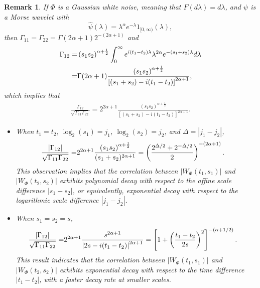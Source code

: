 \documentclass{amsart}
\newtheorem{Remark}{Remark}
\begin{document}
\begin{Remark}
If $\Phi$ is a Gaussian white noise, meaning that $F(d\lambda)=d\lambda$, and
$\psi$ is a Morse wavelet with
$$
\widehat{\psi}(\lambda) = \lambda^{\alpha}e^{-\lambda}1_{[0,\infty)}(\lambda),
$$
then
$ \Gamma_{11}=\Gamma_{22}= \Gamma(2\alpha+1)2^{-(2\alpha+1)}$ and
\begin{align}\notag
\Gamma_{12} =& \left(s_{1}s_{2}\right)^{\alpha+\frac{1}{2}}\int_{0}^{\infty}e^{i(t_{1}-t_{2})\lambda}\lambda^{2\alpha}e^{-(s_{1}+s_{2})\lambda}
d\lambda
\\\notag=&\Gamma(2\alpha+1)
\frac{\left(s_{1}s_{2}\right)^{\alpha+\frac{1}{2}}}{\left[(s_{1}+s_{2})-i(t_{1}-t_{2})\right]^{2\alpha+1}},
\end{align}
which implies that
\begin{align*}
\frac{\Gamma_{12}}{\sqrt{\Gamma_{11}\Gamma_{22}}} = 2^{2\alpha+1}
\frac{\left(s_{1}s_{2}\right)^{\alpha+\frac{1}{2}}}{\left[(s_{1}+s_{2})-i(t_{1}-t_{2})\right]^{2\alpha+1}}.
\end{align*}
\begin{itemize}
\item When $t_{1}=t_{2}$, $\log_{2}(s_{1})=j_{1}$,  $\log_{2}(s_{2})=j_{2}$, and $\Delta = |j_{1}-j_{2}|$,
\begin{align}\notag
\frac{|\Gamma_{12}|}{\sqrt{\Gamma_{11}\Gamma_{22}}}=&2^{2\alpha+1}
\frac{\left(s_{1}s_{2}\right)^{\alpha+\frac{1}{2}}}{(s_{1}+s_{2})^{2\alpha+1}}
=\left(\frac{2^{\Delta/2}+2^{-\Delta/2}}{2}\right)^{-(2\alpha+1)}.
\end{align}
This observation implies that the correlation between $\left|W_{\Phi}(t_{1},s_{1})\right|$ and $\left|W_{\Phi}(t_{2},s_{2})\right|$ exhibits polynomial decay with respect to the affine scale difference $|s_{1}-s_{2}|$,
or equivalently, exponential decay with respect to the logarithmic scale difference $|j_{1}-j_{2}|$.


\item When $s_{1}=s_{2}=s$,
\begin{align}\notag
\frac{|\Gamma_{12}|}{\sqrt{\Gamma_{11}\Gamma_{22}}}=&2^{2\alpha+1}
\frac{s^{2\alpha+1}}{\left|2s-i(t_{1}-t_{2})\right|^{2\alpha+1}}
=
\left[1+\left(\frac{t_{1}-t_{2}}{2s}\right)^{2}\right]^{-(\alpha+1/2)}.
\end{align}
This result indicates that
the correlation between $\left|W_{\Phi}(t_{1},s_{1})\right|$ and $\left|W_{\Phi}(t_{2},s_{2})\right|$ exhibits exponential decay with respect to the time difference $|t_{1}-t_{2}|$, with a faster decay rate at smaller scales.
\end{itemize}
\end{Remark}
\end{document}
